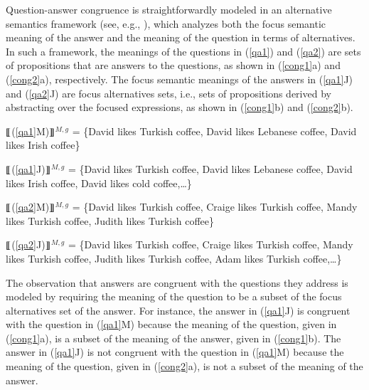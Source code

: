 \documentclass[11pt,fleqn]{article}
\newcommand{\6}{\mbox{$[\hspace*{-.6mm}[$}}
\newcommand{\9}{\mbox{$]\hspace*{-.6mm}]$}}
\newcommand{\sem}[2]{\6#1\9$^{#2}$}
\begin{document}
Question-answer congruence is straightforwardly modeled in an
alternative semantics framework (see, e.g., \citealt{rooth85,rooth92}), which
analyzes both the focus semantic meaning of the answer and the meaning of
the question in terms of alternatives. In such a framework, the meanings
of the questions in (\ref{qa1}) and (\ref{qa2}) are sets of propositions
that are answers to the questions, as shown in (\ref{cong1}a) and
(\ref{cong2}a), respectively. The focus
semantic meanings of the answers in (\ref{qa1}J) and (\ref{qa2}J) are
focus alternatives sets, i.e., sets of propositions derived by
abstracting over the focused expressions, as shown in (\ref{cong1}b) and
(\ref{cong2}b).

\begin{exe}
\ex\label{cong1}

\begin{xlist}

\ex \sem{(\ref{qa1}M)}{M,g} = \{David likes Turkish coffee, David likes Lebanese coffee, David likes Irish coffee\}

\ex \sem{(\ref{qa1}J)}{M,g} = \{David likes Turkish coffee, David likes Lebanese coffee, David likes Irish coffee, David likes cold coffee,\ldots\} 

\end{xlist}

\ex\label{cong2}

\begin{xlist}

\ex \sem{(\ref{qa2}M)}{M,g} = \{David likes Turkish coffee, Craige likes Turkish coffee, Mandy likes Turkish coffee, Judith likes Turkish coffee\}

\ex \sem{(\ref{qa2}J)}{M,g} = \{David likes Turkish coffee, Craige likes Turkish coffee, Mandy likes Turkish coffee, Judith likes Turkish coffee, Adam likes Turkish coffee,\ldots\}

\end{xlist}

\end{exe} The observation that answers are congruent with the questions
they address is modeled by requiring the meaning of the question to be a
subset of the focus alternatives set of the answer. For instance, the
answer in (\ref{qa1}J) is congruent with the question in (\ref{qa1}M)
because the meaning of the question, given in (\ref{cong1}a), is a
subset of the meaning of the answer, given in (\ref{cong1}b). The
answer in (\ref{qa1}J) is not congruent with the question in
(\ref{qa1}M) because the meaning of the question, given in
(\ref{cong2}a), is not a subset of the meaning of the answer. 
\end{document}
